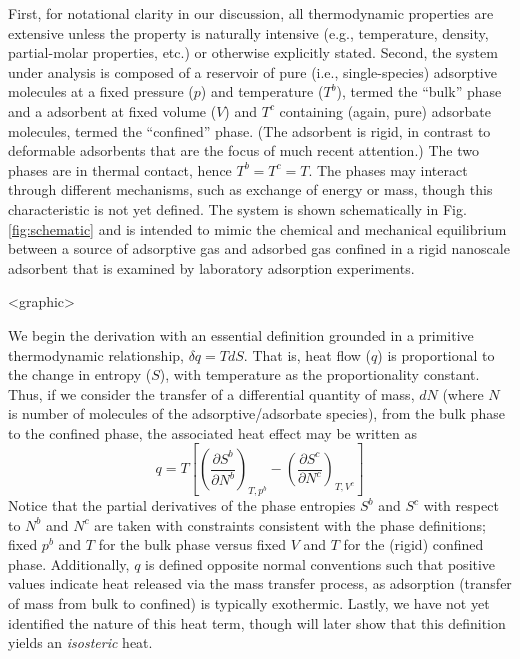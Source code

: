 \documentclass[preprint,pre,showkeys,12pt,superscriptaddress,nofootinbib]{revtex4-1}
\begin{document}
First, for notational clarity in our discussion, all thermodynamic properties are extensive unless the property is naturally intensive (e.g., temperature, density, partial-molar properties, etc.) or otherwise explicitly stated. Second, the system under analysis is composed of a reservoir of pure (i.e., single-species) adsorptive molecules at a fixed pressure ($p$) and temperature ($T^b$), termed the ``bulk'' phase and a adsorbent at fixed volume ($V$) and $T^c$ containing (again, pure) adsorbate molecules, termed the ``confined'' phase. (The adsorbent is rigid, in contrast to deformable adsorbents that are the focus of much recent attention\cite{}.) The two phases are in thermal contact, hence $T^b = T^c = T$. The phases may interact through different mechanisms, such as exchange of energy or mass, though this characteristic is not yet defined. The system is shown schematically in Fig. \ref{fig:schematic} and is intended to mimic the chemical and mechanical equilibrium between a source of adsorptive gas and adsorbed gas confined in a rigid nanoscale adsorbent that is examined by laboratory adsorption experiments.

<graphic>

We begin the derivation with an essential definition grounded in a primitive thermodynamic relationship, $\delta q = T dS$. That is, heat flow ($q$) is proportional to the change in entropy ($S$), with temperature as the proportionality constant. Thus, if we consider the transfer of a differential quantity of mass, $dN$ (where $N$ is number of molecules of the adsorptive/adsorbate species), from the bulk phase to the confined phase, the associated heat effect may be written as
%
\begin{equation}
  q = T \left[
    \left(\dfrac{\partial S^b}{\partial N^b}\right)_{T,p^b}
    -\left(\dfrac{\partial S^c}{\partial N^c}\right)_{T,V^c}
  \right]
  \label{eq:q_basedef}
\end{equation}
%
Notice that the partial derivatives of the phase entropies $S^b$ and $S^c$ with respect to $N^b$ and $N^c$ are taken with constraints consistent with the phase definitions; fixed $p^b$ and $T$ for the bulk phase versus fixed $V$ and $T$ for the (rigid) confined phase. Additionally, $q$ is defined opposite normal conventions such that positive values indicate heat released via the mass transfer process, as adsorption (transfer of mass from bulk to confined) is typically exothermic. Lastly, we have not yet identified the nature of this heat term, though will later show that this definition yields an {\it isosteric} heat.
\end{document}
